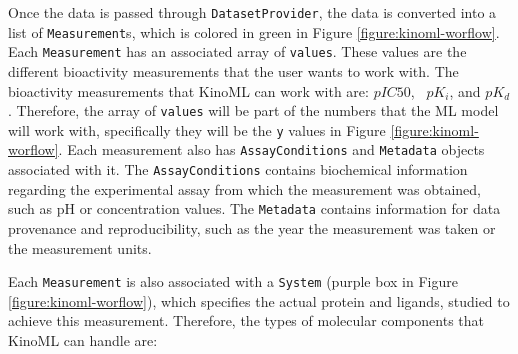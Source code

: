 \documentclass[9pt,lessons]{livecoms}
\begin{document}
Once the data is passed through \texttt{DatasetProvider}, the data is converted into a list of \texttt{Measurement}s, which is colored in green in Figure \ref{figure:kinoml-worflow}. Each \texttt{Measurement} has an associated array of \texttt{values}. These values are the different bioactivity measurements that the user wants to work with. The bioactivity measurements that KinoML can work with are: $pIC50$, ~$pK_{i}$, and $pK_{d}$. Therefore, the array of \texttt{values} will be part of the numbers that the ML model will work with, specifically they will be the \texttt{y} values in Figure \ref{figure:kinoml-worflow}. Each measurement also has \texttt{AssayConditions} and \texttt{Metadata} objects associated with it. The \texttt{AssayConditions} contains biochemical information regarding the experimental assay from which the measurement was obtained, such as pH or concentration values. The \texttt{Metadata} contains information for data provenance and reproducibility, such as the year the measurement was taken or the measurement units. 

Each \texttt{Measurement} is also associated with a \texttt{System} (purple box in Figure \ref{figure:kinoml-worflow}), which specifies the actual protein and ligands, studied to achieve this measurement. %
Therefore, the types of molecular components that KinoML can handle are: 
\end{document}
